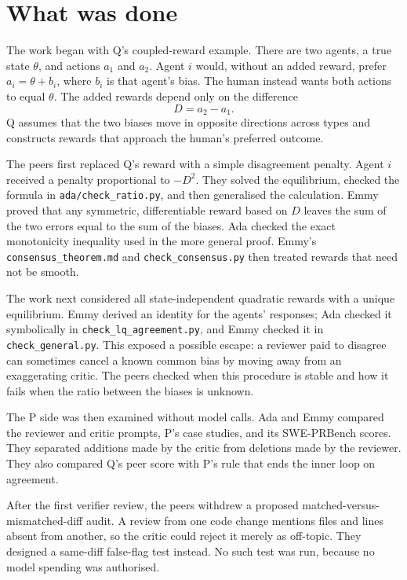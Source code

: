 \documentclass{article}
\begin{document}
\section{What was done}

The work began with Q's coupled-reward example. There are two agents, a true state $\theta$, and actions $a_1$ and $a_2$. Agent $i$ would, without an added reward, prefer $a_i=\theta+b_i$, where $b_i$ is that agent's bias. The human instead wants both actions to equal $\theta$. The added rewards depend only on the difference
\[
D=a_2-a_1.
\]
Q assumes that the two biases move in opposite directions across types and constructs rewards that approach the human's preferred outcome.

The peers first replaced Q's reward with a simple disagreement penalty. Agent $i$ received a penalty proportional to $-D^2$. They solved the equilibrium, checked the formula in \texttt{ada/check\_ratio.py}, and then generalised the calculation. Emmy proved that any symmetric, differentiable reward based on $D$ leaves the sum of the two errors equal to the sum of the biases. Ada checked the exact monotonicity inequality used in the more general proof. Emmy's \texttt{consensus\_theorem.md} and \texttt{check\_consensus.py} then treated rewards that need not be smooth.

The work next considered all state-independent quadratic rewards with a unique equilibrium. Emmy derived an identity for the agents' responses; Ada checked it symbolically in \texttt{check\_lq\_agreement.py}, and Emmy checked it in \texttt{check\_general.py}. This exposed a possible escape: a reviewer paid to disagree can sometimes cancel a known common bias by moving away from an exaggerating critic. The peers checked when this procedure is stable and how it fails when the ratio between the biases is unknown.

The P side was then examined without model calls. Ada and Emmy compared the reviewer and critic prompts, P's case studies, and its SWE-PRBench scores. They separated additions made by the critic from deletions made by the reviewer. They also compared Q's peer score with P's rule that ends the inner loop on agreement.

After the first verifier review, the peers withdrew a proposed matched-versus-mismatched-diff audit. A review from one code change mentions files and lines absent from another, so the critic could reject it merely as off-topic. They designed a same-diff false-flag test instead. No such test was run, because no model spending was authorised.
\end{document}
